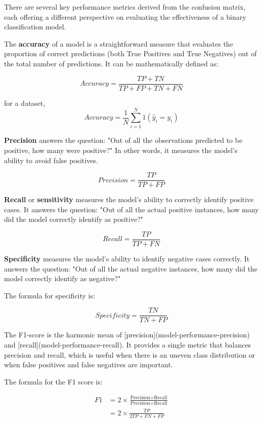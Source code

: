 		
		There are several key performance metrics derived from the confusion matrix, each offering a different perspective on evaluating the effectiveness of a binary classification model.
		
		\bigskip
		
		The \textbf{accuracy} of a model is a straightforward measure that evaluates the proportion of correct predictions (both True Positives and True Negatives) out of the total number of predictions. It can be mathematically defined as:
		
		
		$$Accuracy=\frac{TP+TN}{TP+FP+TN+FN}$$
		
		for a dataset,
		$$
		Accuracy = \frac{1}{N} \sum_{i=1}^{N} 1(\hat{y}_i = y_i)
		$$
		
		
		\textbf{Precision} answers the question: "Out of all the observations predicted to be positive, how many were positive?" In other words, it measures the model's ability to avoid false positives.
		
		$$Precision=\frac{TP}{TP+FP}$$
		
		
		\textbf{Recall} or \textbf{sensitivity} measures the model's ability to correctly identify positive cases. It answers the question: "Out of all the actual positive instances, how many did the model correctly identify as positive?"
		
		
		$$Recall=\frac{TP}{TP + FN}$$
		
		\textbf{Specificity} measures the model's ability to identify negative cases correctly. It answers the question: "Out of all the actual negative instances, how many did the model correctly identify as negative?"
		
		The formula for specificity is:
		
		$$Specificity= \frac{TN}{TN + FP}$$
		
		The F1-score is the harmonic mean of [precision](model-performance-precision) and [recall](model-performance-recall). It provides a single metric that balances precision and recall, which is useful when there is an uneven class distribution or when false positives and false negatives are important.
		
		The formula for the F1 score is:
		
		\begin{align*}
			F1 
			&= 2 \times \frac{\text{Precision} \times \text{Recall}}{\text{Precision} + \text{Recall}}\\
			&= 2\times \frac{TP}{2TP+FN+FP}\\
		\end{align*}	
		
